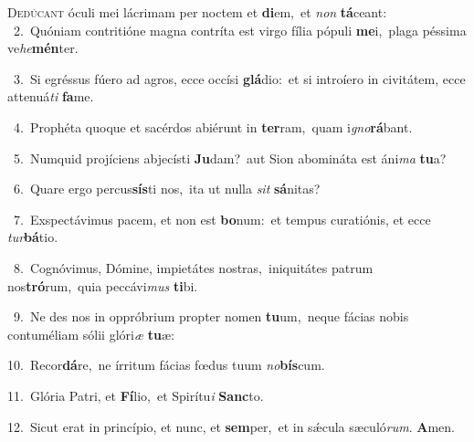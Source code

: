 \lettrine{\initial\textcolor{\initialcolor}{D}}{edúcant} óculi mei lácrimam per noctem et \textbf{di}\-em,~\star et \textit{non} \textbf{tá}\-ceant:\\
{\numbfont\textcolor{\numbcolor}{~2.}}~Quóniam contritióne magna contríta est virgo fília pópuli \textbf{me}\-i,~\star plaga péssima ve\-\textit{he}\-\textbf{mén}ter.\par
{\numbfont\textcolor{\numbcolor}{~3.}}~Si egréssus fúero ad agros, ecce occísi \textbf{glá}\-dio:~\star et si introíero in civitátem, ecce attenuá\textit{ti} \textbf{fa}\-me.\par
{\numbfont\textcolor{\numbcolor}{~4.}}~Prophéta quoque et sacérdos abiérunt in \textbf{ter}\-ram,~\star quam i\-\textit{gno}\-\textbf{rá}bant.\par
{\numbfont\textcolor{\numbcolor}{~5.}}~Numquid projíciens abjecísti \textbf{Ju}\-dam?~\star aut Sion abomináta est áni\textit{ma} \textbf{tu}\-a?\par
{\numbfont\textcolor{\numbcolor}{~6.}}~Quare ergo percus\-\textbf{sís}\-ti nos,~\star ita ut nulla \textit{sit} \textbf{sá}\-nitas?\par
{\numbfont\textcolor{\numbcolor}{~7.}}~Exspectávimus pacem, et non est \textbf{bo}\-num:~\star et tempus curatiónis, et ecce \textit{tur}\-\textbf{bá}tio.\par
{\numbfont\textcolor{\numbcolor}{~8.}}~Cognóvimus, Dómine, impietátes nostras,~\dagger iniquitátes patrum nos\-\textbf{tró}\-rum,~\star quia peccávi\textit{mus} \textbf{ti}\-bi.\par
{\numbfont\textcolor{\numbcolor}{~9.}}~Ne des nos in oppróbrium propter nomen \textbf{tu}\-um,~\star neque fácias nobis contuméliam sólii glóri\textit{æ} \textbf{tu}\-æ:\par
{\numbfont\textcolor{\numbcolor}{10.}}~Recor\-\textbf{dá}\-re,~\star ne írritum fácias fœdus tuum \textit{no}\-\textbf{bís}cum.\par
{\numbfont\textcolor{\numbcolor}{11.}}~Glória Patri, et \textbf{Fí}\-lio,~\star et Spirítu\textit{i} \textbf{Sanc}\-to.\par
{\numbfont\textcolor{\numbcolor}{12.}}~Sicut erat in princípio, et nunc, et \textbf{sem}\-per,~\star et in sǽcula sæculó\-\textit{rum}\-. \textbf{A}\-men.\par
